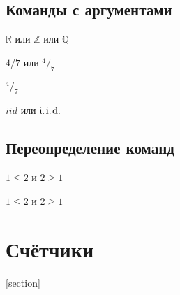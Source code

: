 \documentclass[12pt, a4paper]{article}
\theoremstyle{plain}              %
\theoremstyle{definition}         %
\begin{document}


\subsection{Команды с аргументами}

\newcommand{\bb}[1]{\ensuremath{\mathbb{#1}} }

\bb{R} или \bb{Z} или \bb{Q}


$4/7$ или $^4/_7$

\newcommand{\fr}[2]{^#1/_#2}

$\fr{4}{7}$

\newcommand{\iid}{\text{i.\hspace{1pt}i.\hspace{1pt}d.}}

$iid$ или $\iid$

\subsection{Переопределение команд}

$ 1 \le 2 $ и $ 2 \ge 1 $

\renewcommand{\le}{\leqslant}
\renewcommand{\ge}{\geqslant}

$ 1 \le 2 $ и $ 2 \ge 1 $

\section{Счётчики}


[section]

\setcounter{jtem}{13}



\renewcommand{\thepage}{\Roman{page}}
\renewcommand{\thesection}{\Asbuk{section}}
\setcounter{section}{0}

\end{document}
